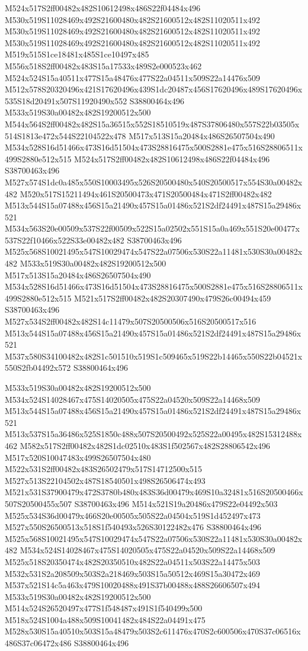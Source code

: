 \documentclass{article}
\begin{document}
\begin{multicols}{2}
M524x517S2ff00482x482S10612498x486S22f04484x496 M530x519S11028469x492S21600480x482S21600512x482S11020511x492 M530x519S11028469x492S21600480x482S21600512x482S11020511x492 M530x519S11028469x492S21600480x482S21600512x482S11020511x492 M519x515S1ce18481x485S1ce10497x485 M556x518S2ff00482x483S15a17533x489S2e000523x462 M524x524S15a40511x477S15a48476x477S22a04511x509S22a14476x509 M512x578S20320496x421S17620496x439S1dc20487x456S17620496x489S17620496x535S18d20491x507S11920490x552 S38800464x496 M533x519S30a00482x482S19200512x500 M544x564S2ff00482x482S15a36515x552S18510519x487S37806480x557S22b03505x514S1813e472x544S22104522x478 M517x513S15a20484x486S26507504x490 M534x528S16d51466x473S16d51504x473S28816475x500S2881e475x516S28806511x499S2880e512x515 M524x517S2ff00482x482S10612498x486S22f04484x496 S38700463x496 M527x574S1dc0a485x550S10003495x526S20500480x540S20500517x554S30a00482x482 M520x517S15211494x461S20500473x471S20500484x471S2ff00482x482 M513x544S15a07488x456S15a21490x457S15a01486x521S2df24491x487S15a29486x521 M534x563S20e00509x537S22f00509x522S15a02502x551S15a0a469x551S20e00477x537S22f10466x522S33e00482x482 S38700463x496 M525x568S10021495x547S10029474x547S22a07506x530S22a11481x530S30a00482x482 M533x519S30a00482x482S19200512x500 M517x513S15a20484x486S26507504x490 M534x528S16d51466x473S16d51504x473S28816475x500S2881e475x516S28806511x499S2880e512x515 M521x517S2ff00482x482S20307490x479S26c00494x459 S38700463x496 M527x534S2ff00482x482S14c11479x507S20500506x516S20500517x516 M513x544S15a07488x456S15a21490x457S15a01486x521S2df24491x487S15a29486x521 M537x580S34100482x482S1c501510x519S1c509465x519S22b14465x550S22b04521x550S2fb04492x572 S38800464x496

M533x519S30a00482x482S19200512x500 M534x524S14028467x475S14020505x475S22a04520x509S22a14468x509 M513x544S15a07488x456S15a21490x457S15a01486x521S2df24491x487S15a29486x521 M513x537S15a36486x525S1850c488x507S20500492x525S22a00495x482S15312488x462 M582x517S2ff00482x482S1dc02510x483S1f502567x482S28806542x496 M517x520S10047483x499S26507504x480 M522x531S2ff00482x483S26502479x517S14712500x515 M527x513S22104502x487S18540501x498S26506474x493 M521x531S37900479x472S3780b480x483S36d00479x469S10a32481x516S20500466x507S20500455x507 S38700463x496 M514x521S19a20486x479S22e04492x503 M525x534S36d00479x466S20e00505x505S22a04504x519S1d452497x473 M527x550S26500513x518S1f540493x526S30122482x476 S38800464x496 M525x568S10021495x547S10029474x547S22a07506x530S22a11481x530S30a00482x482 M534x524S14028467x475S14020505x475S22a04520x509S22a14468x509 M525x518S20350474x482S20350510x482S22a04511x503S22a14475x503 M532x531S2a208509x503S2a218469x503S15a50512x469S15a30472x469 M537x521S14c5a463x479S10020488x491S37b00488x488S26606507x494 M533x519S30a00482x482S19200512x500 M514x524S26520497x477S1f548487x491S1f540499x500 M518x524S1004a488x509S10041482x484S22a04491x475 M528x530S15a40510x503S15a48479x503S2c611476x470S2c600506x470S37c06516x486S37c06472x486 S38800464x496


\end{multicols}
\end{document}
